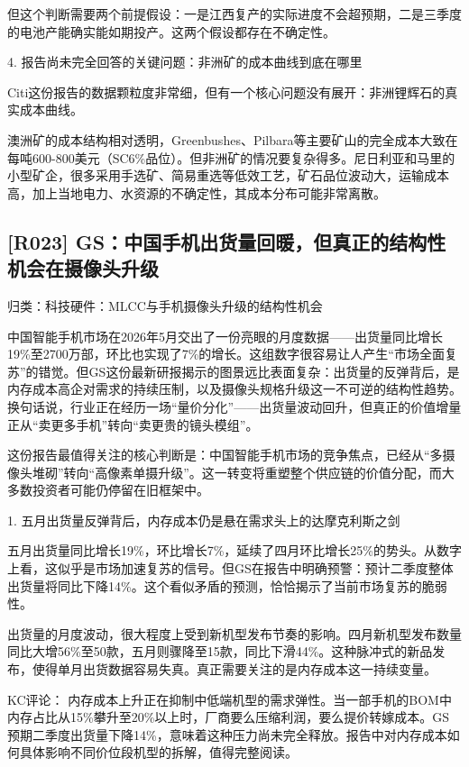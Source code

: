 \documentclass[11pt]{ctexart}
\begin{document}
但这个判断需要两个前提假设：一是江西复产的实际进度不会超预期，二是三季度的电池产能确实能如期投产。这两个假设都存在不确定性。

4. 报告尚未完全回答的关键问题：非洲矿的成本曲线到底在哪里

Citi这份报告的数据颗粒度非常细，但有一个核心问题没有展开：非洲锂辉石的真实成本曲线。

澳洲矿的成本结构相对透明，Greenbushes、Pilbara等主要矿山的完全成本大致在每吨600-800美元（SC6\%品位）。但非洲矿的情况要复杂得多。尼日利亚和马里的小型矿企，很多采用手选矿、简易重选等低效工艺，矿石品位波动大，运输成本高，加上当地电力、水资源的不确定性，其成本分布可能非常离散。

\subsection{[R023] GS：中国手机出货量回暖，但真正的结构性机会在摄像头升级}
{\small\color{refgray}归类：科技硬件：MLCC与手机摄像头升级的结构性机会}

中国智能手机市场在2026年5月交出了一份亮眼的月度数据——出货量同比增长19\%至2700万部，环比也实现了7\%的增长。这组数字很容易让人产生“市场全面复苏”的错觉。但GS这份最新研报揭示的图景远比表面复杂：出货量的反弹背后，是内存成本高企对需求的持续压制，以及摄像头规格升级这一不可逆的结构性趋势。换句话说，行业正在经历一场“量价分化”——出货量波动回升，但真正的价值增量正从“卖更多手机”转向“卖更贵的镜头模组”。

这份报告最值得关注的核心判断是：中国智能手机市场的竞争焦点，已经从“多摄像头堆砌”转向“高像素单摄升级”。这一转变将重塑整个供应链的价值分配，而大多数投资者可能仍停留在旧框架中。

1. 五月出货量反弹背后，内存成本仍是悬在需求头上的达摩克利斯之剑

五月出货量同比增长19\%，环比增长7\%，延续了四月环比增长25\%的势头。从数字上看，这似乎是市场加速复苏的信号。但GS在报告中明确预警：预计二季度整体出货量将同比下降14\%。这个看似矛盾的预测，恰恰揭示了当前市场复苏的脆弱性。

出货量的月度波动，很大程度上受到新机型发布节奏的影响。四月新机型发布数量同比大增56\%至50款，五月则骤降至15款，同比下滑44\%。这种脉冲式的新品发布，使得单月出货数据容易失真。真正需要关注的是内存成本这一持续变量。

KC评论： 内存成本上升正在抑制中低端机型的需求弹性。当一部手机的BOM中内存占比从15\%攀升至20\%以上时，厂商要么压缩利润，要么提价转嫁成本。GS预期二季度出货量下降14\%，意味着这种压力尚未完全释放。报告中对内存成本如何具体影响不同价位段机型的拆解，值得完整阅读。
\end{document}
